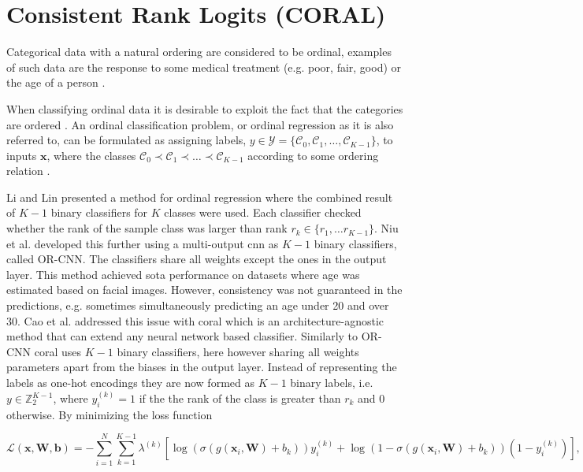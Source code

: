 \section{Consistent Rank Logits (CORAL)}
Categorical data with a natural ordering are considered to be ordinal, examples of such data are the response to some medical treatment (e.g. poor, fair, good) \cite{Agresti2007} or the age of a person \cite{Cao2019}.

When classifying ordinal data it is desirable to exploit the fact that the categories are ordered \cite{Agresti2007}. An ordinal classification problem, or ordinal regression as it is also referred to, can be formulated as assigning labels, $y \in \mathcal{Y} = \{\mathcal{C}_0, \mathcal{C}_1, \hdots, \mathcal{C}_{K-1} \}$, to inputs $\pmb{x}$, where the classes $\mathcal{C}_0 \prec \mathcal{C}_1 \prec \hdots \prec \mathcal{C}_{K-1}$ according to some ordering relation \cite{Cao2019}.

Li and Lin \cite{Li2007} presented a method for ordinal regression where the combined result of $K-1$ binary classifiers for $K$ classes were used. Each classifier checked whether the rank of the sample class was larger than rank $r_k \in \{r_1, \hdots r_{K-1}\}$. Niu et al. \cite{Niu2016} developed this further using a multi-output \gls{cnn} as $K-1$ binary classifiers, called OR-CNN. The classifiers share all weights except the ones in the output layer. This method achieved \gls{sota} performance on datasets where age was estimated based on facial images. However, consistency was not guaranteed in the predictions, e.g. sometimes simultaneously predicting an age under 20 and over 30. Cao et al. \cite{Cao2019} addressed this issue with \gls{coral} which is an architecture-agnostic method that can extend any neural network based classifier. Similarly to OR-CNN \gls{coral} uses $K-1$ binary classifiers, here however sharing all weights parameters apart from the biases in the output layer. Instead of representing the labels as one-hot encodings they are now formed as $K-1$ binary labels, i.e. $y \in \mathbb{Z}_2^{K-1}$, where $y_i^{(k)} = 1$ if the the rank of the class is greater than $r_k$ and 0 otherwise. By minimizing the loss function

\begin{equation}
 \mathcal{L}(\pmb{x}, \pmb{W}, \pmb{b}) = - \sum_{i=1}^N \sum_{k=1}^{K-1} \lambda^{(k)} [\log(\sigma(g(\pmb{x}_i, \pmb{W}) + b_k))y_i^{(k)} + \log(1 - \sigma(g(\pmb{x}_i, \pmb{W}) + b_k))(1 - y_i^{(k)})],
 \label{eq:coral-loss}
\end{equation}

